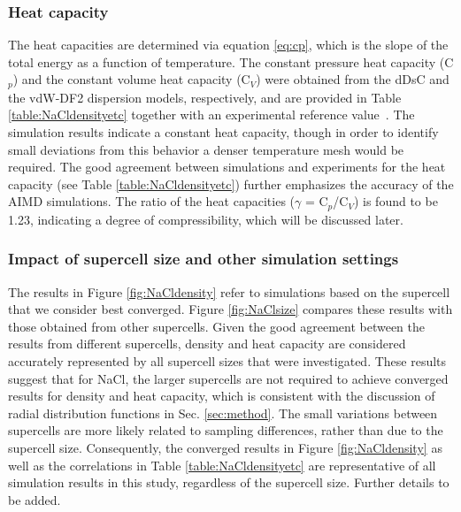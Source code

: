 \documentclass[preprint,3p,10pt,onecolumn,number,sort&compress]{elsarticle}
\begin{document}
\subsubsection{Heat capacity} 
The heat capacities are determined via equation \ref{eq:cp}, which is the slope of the total energy as a function of temperature. The constant pressure heat capacity (C$_p$) and the constant volume heat capacity (C$_V$) were obtained from the dDsC and the vdW-DF2 dispersion models, respectively, and are provided in Table \ref{table:NaCldensityetc} together with an experimental reference value~\cite{NIST}. The simulation results indicate a constant heat capacity, though in order to identify small deviations from this behavior a denser temperature mesh would be required. The good agreement between simulations and experiments for the heat capacity (see Table \ref{table:NaCldensityetc}) further emphasizes the accuracy of the AIMD simulations. The ratio of the heat capacities ($\gamma$ = C$_p$/C$_V$) is found to be 1.23, indicating a degree of compressibility, which will be discussed later. 


\subsubsection{Impact of supercell size and other simulation settings}
The results in Figure \ref{fig:NaCldensity} refer to simulations based on the supercell that we consider best converged. Figure \ref{fig:NaClsize} compares these results with those obtained from other supercells. Given the good agreement between the results from different supercells, density and heat capacity are considered accurately represented by all supercell sizes that were investigated.
 These results suggest that for NaCl, the larger supercells are not required to achieve converged results for density and heat capacity, which is consistent with the discussion of radial distribution functions in Sec. \ref{sec:method}. The small variations between supercells are more likely related to sampling differences, rather than due to the supercell size. Consequently, the converged results in Figure \ref{fig:NaCldensity} as well as the correlations in Table \ref{table:NaCldensityetc} are representative of all simulation results in this study, regardless of the supercell size. {\color{red} Further details to be added.} %
\end{document}

